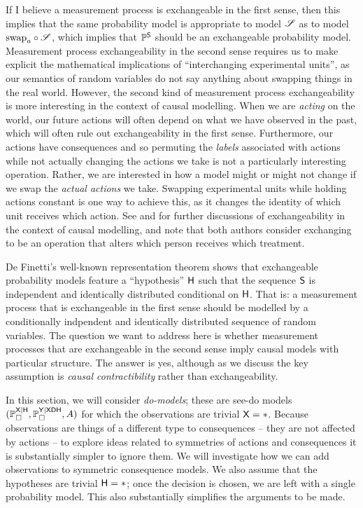 If I believe a measurement process is exchangeable in the first sense, then this implies that the same probability model is appropriate to model $\mathscr{S}$ as to model $\text{swap}_a\circ \mathscr{S}$, which implies that $\mathbb{P}^{\mathsf{S}}$ should be an exchangeable probability model. Measurement process exchangeability in the second sense requires us to make explicit the mathematical implications of ``interchanging experimental units'', as our semantics of random variables do not say anything about swapping things in the real world. However, the second kind of measurement process exchangeability is more interesting in the context of causal modelling. When we are \emph{acting} on the world, our future actions will often depend on what we have observed in the past, which will often rule out exchangeability in the first sense. Furthermore, our actions have consequences and so permuting the \emph{labels} associated with actions while not actually changing the actions we take is not a particularly interesting operation. Rather, we are interested in how a model might or might not change if we swap the \emph{actual actions} we take. Swapping experimental units while holding actions constant is one way to achieve this, as it changes the identity of which unit receives which action. See \citet{dawid_decision-theoretic_2020} and \citet{greenland_identifiability_1986} for further discussions of exchangeability in the context of causal modelling, and note that both authors consider exchanging to be an operation that alters which person receives which treatment.

De Finetti's well-known representation theorem shows that exchangeable probability models feature a ``hypothesis'' $\mathsf{H}$ such that the sequence $\mathsf{S}$ is independent and identically distributed conditional on $\mathsf{H}$. That is: a measurement process that is exchangeable in the first sense should be modelled by a conditionally indpendent and identically distributed sequence of random variables. The question we want to address here is whether measurement processes that are exchangeable in the second sense imply causal models with particular structure. The answer is yes, although as we discuss the key assumption is \emph{causal contractibility} rather than exchangeability.

In this section, we will consider \emph{do-models}; these are see-do models $(\mathbb{P}_\square^{\mathsf{X}|\mathsf{H}},\mathbb{P}_\square^{\mathsf{Y}|\mathsf{XDH}},A)$ for which the observations are trivial $\mathsf{X}=*$. Because observations are things of a different type to consequences -- they are not affected by actions -- to explore ideas related to symmetries of actions and consequences it is substantially simpler to ignore them. We will investigate how we can add observations to symmetric consequence models. We also assume that the hypotheses are trivial $\mathsf{H}=*$; once the decision is chosen, we are left with a single probability model. This also substantially simplifies the arguments to be made.

